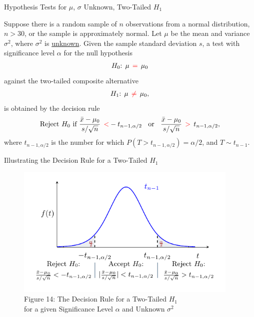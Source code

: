 \documentclass[pdf]{beamer}
\theoremstyle{remark}
\theoremstyle{definition}
\begin{document}
\begin{frame}[t]{Hypothesis Tests for $\mu$, $\sigma$ Unknown, Two-Tailed $H_1$}
\small
\begin{tcolorbox}[colback=white!5,colframe=franklinblue]%
Suppose there is a random sample of $n$ observations from a normal distribution, $n > 30$, or the sample is approximately normal.  Let $\mu$ be the mean and variance $\sigma^2$, where $\sigma^2$ is \underline{unknown}. Given the sample standard deviation $s$, a test with significance level $\alpha$ for the null hypothesis 
\vspace{-1.0ex}
\begin{align*} 
H_0\text{: }  \mu \;\, \textcolor{red}{=} \;\, \mu_0  
\end{align*} 
\vspace{-1.0ex}
against the two-tailed composite alternative 
\vspace{0.0ex}
\begin{align*} 
H_1\text{: }  \mu \;\, \textcolor{red}{\neq} \;\, \mu_0, 
\end{align*} 
\vspace{-1.0ex}
is obtained by the decision rule 
\vspace{0.0ex}
\begin{equation} 
\text{Reject } H_0 \text{ if } \frac{\bar{x} - \mu_0}{s/ \sqrt{n}} \;\, \textcolor{red}{<} -t_{n-1,\alpha/2} \;\; \text{ or } \;\;
\frac{\bar{x} - \mu_0}{s/ \sqrt{n}} \;\, \textcolor{red}{>} \;\, t_{n-1,\alpha/2},
\end{equation} 
where $t_{n-1,\alpha/2}$ is the number for which $P(T > t_{n-1,\alpha/2}) = \alpha/2$, and $T \sim t_{n-1}$. 
\end{tcolorbox}
\end{frame}

\begin{frame}[t]{Illustrating the Decision Rule for a Two-Tailed $H_1$ }
\begin{figure}[htbp]
    \centering
    \captionsetup{justification=centering}
    \includegraphics[clip, trim=0.5cm 0.5cm 0.0cm 0cm, width=0.95\textwidth]{Hypothesis_Testing_Module_9_t3.pdf}  
    \caption{Figure {\color{franklinblue} 14}: The Decision Rule for a Two-Tailed $H_1$ \\ for a given Significance Level $\alpha$ and Unknown $\sigma^2$}
    \label{fig:gauss6}
\end{figure}
\end{frame}
\end{document}
